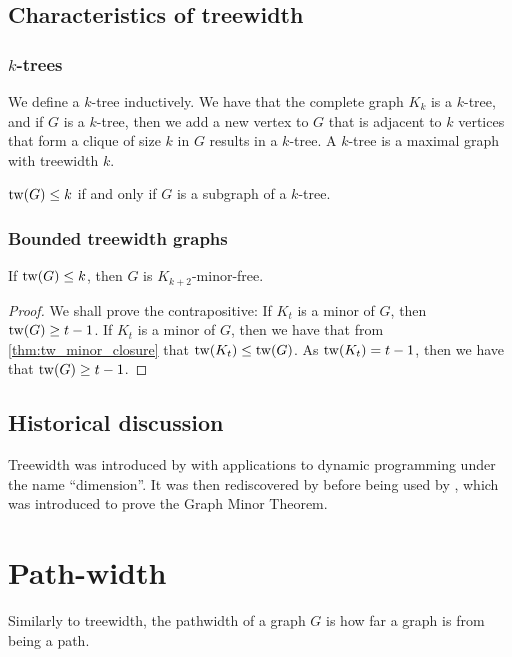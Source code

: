 \subsection{Characteristics of treewidth}\label{ssec:characterising_Treewidth}
\subsubsection{\(k\)-trees}\label{sssec:k-trees}
We define a \(k\)-tree inductively. We have that the complete graph \(K_k\) is a \(k\)-tree, and if \(G\) is a \(k\)-tree, then we add a new vertex to \(G\) that is adjacent to \(k\) vertices that form a clique of size \(k\) in \(G\) results in a \(k\)-tree.
A \(k\)-tree is a maximal graph with treewidth \(k\).
\begin{theorem}
	\(\operatorname{tw}(G) \leq k\) if and only if \(G\) is a subgraph of a \(k\)-tree.
\end{theorem}


\subsubsection{Bounded treewidth graphs}\label{sssec:Graph_treewidth_Bounded}
\begin{theorem}\label{thm:treewidth_clique-minor-free}
	If \(\operatorname{tw}(G) \leq k\), then \(G\) is \(K_{k+2}\)-minor-free.
\end{theorem}
\begin{proof}
	We shall prove the contrapositive: If \(K_t\) is a minor of \(G\), then \(\operatorname{tw}(G) \geq t-1\).
	If \(K_t\) is a minor of \(G\), then we have that from \cref{thm:tw_minor_closure} that \(\operatorname{tw}(K_t) \leq \operatorname{tw}(G)\). As \(\operatorname{tw}(K_t) = t-1\), then we have that \(\operatorname{tw}(G) \geq t - 1\).
\end{proof}

\subsection{Historical discussion}\label{ssec:tw_historical}
Treewidth was introduced by \textcite{berteleChapterEliminationVariables1972} with applications to dynamic programming under the name ``dimension''. It was then rediscovered by \textcite{halinSfunctionsGraphs1976} before being used by \textcite{robertsonGraphMinorsIII1984}, which was introduced to prove the Graph Minor Theorem\cite{robertsonGraphMinorsXX2004}.


\section{Path-width}\label{sec:Pathwidth}
Similarly to treewidth, the pathwidth of a graph \(G\) is how far a graph is from being a path.

